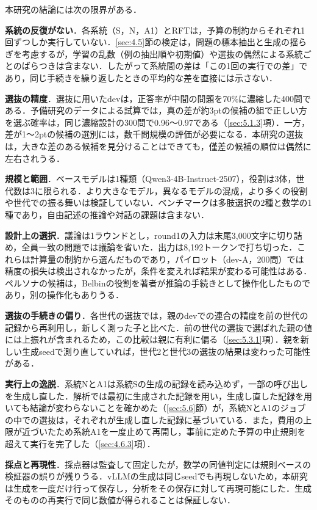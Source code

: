 本研究の結論には次の限界がある．

\textbf{系統の反復がない}．各系統（S，N，A1）とRFTは，予算の制約からそれぞれ1回ずつしか実行していない．\ref{sec:4.5}節の検定は，問題の標本抽出と生成の揺らぎを考慮するが，学習の乱数（例の抽出順や初期値）や選抜の偶然による系統ごとのばらつきは含まない．したがって系統間の差は「この1回の実行での差」であり，同じ手続きを繰り返したときの平均的な差を直接には示さない．

\textbf{選抜の精度}．選抜に用いたdevは，正答率が中間の問題を70\%に濃縮した400問である．予備研究のデータによる試算では，真の差が約3ptの候補の組で正しい方を選ぶ確率は，同じ濃縮設計の300問で0.96〜0.97である（\ref{sec:5.1.3}項）．一方，差が1〜2ptの候補の選別には，数千問規模の評価が必要になる．本研究の選抜は，大きな差のある候補を見分けることはできても，僅差の候補の順位は偶然に左右されうる．

\textbf{規模と範囲}．ベースモデルは1種類（Qwen3-4B-Instruct-2507），役割は3体，世代数は3に限られる．より大きなモデル，異なるモデルの混成，より多くの役割や世代での振る舞いは検証していない．ベンチマークは多肢選択の2種と数学の1種であり，自由記述の推論や対話の課題は含まない．

\textbf{設計上の選択}．議論は1ラウンドとし，round1の入力は末尾3,000文字に切り詰め，全員一致の問題では議論を省いた．出力は8,192トークンで打ち切った．これらは計算量の制約から選んだものであり，パイロット（dev-A，200問）では精度の損失は検出されなかったが，条件を変えれば結果が変わる可能性はある．ペルソナの候補は，Belbinの役割を著者が推論の手続きとして操作化したものであり，別の操作化もありうる．

\textbf{選抜の手続きの偏り}．各世代の選抜では，親のdevでの連合の精度を前の世代の記録から再利用し，新しく測った子と比べた．前の世代の選抜で選ばれた親の値には上振れが含まれるため，この比較は親に有利に偏る（\ref{sec:5.3.1}項）．親を新しい生成seedで測り直していれば，世代2と世代3の選抜の結果は変わった可能性がある．

\textbf{実行上の逸脱}．系統NとA1は系統Sの生成の記録を読み込めず，一部の呼び出しを生成し直した．解析では最初に生成された記録を用い，生成し直した記録を用いても結論が変わらないことを確かめた（\ref{sec:5.6}節）が，系統NとA1のジョブの中での選抜は，それぞれが生成し直した記録に基づいている．また，費用の上限が近づいたため系統A1を一度止めて再開し，事前に定めた予算の中止規則を超えて実行を完了した（\ref{sec:4.6.3}項）．

\textbf{採点と再現性}．採点器は監査して固定したが，数学の同値判定には規則ベースの検証器の誤りが残りうる．vLLMの生成は同じseedでも再現しないため，本研究は生成を一度だけ行って保存し，分析をその保存に対して再現可能にした．生成そのものの再実行で同じ数値が得られることは保証しない．
